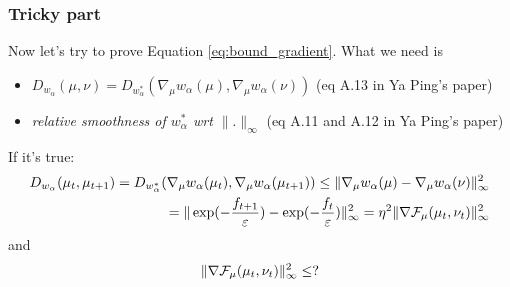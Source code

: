 \documentclass[a4paper, 10pt]{article}
\begin{document}
\subsubsection{Tricky part}
Now let's try to prove Equation \ref{eq:bound_gradient}. 
What we need is 
\begin{itemize}
	\item $D_{w_{\alpha}}(\mu,\nu)=D_{w_{\alpha}^*}(\nabla_{\mu}w_{\alpha}(\mu), \nabla_{\mu}w_{\alpha}(\nu))$ (eq A.13 in Ya Ping's paper)
	\item  \textit{relative smoothness of $w_{\alpha}^*$ wrt $\|.\|_{\infty}$} (eq A.11 and A.12 in Ya Ping's paper)
\end{itemize}
 If it's true:
\begin{align*}
D_{w_{\alpha}}(\mu_t,\mu_{t+1}) = D_{w_{\alpha}^*}(\nabla_{\mu}w_{\alpha}(\mu_t), \nabla_{\mu}w_{\alpha}(\mu_{t+1}))\le \| \nabla_{\mu}w_{\alpha}(\mu)- \nabla_{\mu}w_{\alpha}(\nu)\|^2_{\infty}\\
=\| \exp(-\frac{f_{t+1}}{\varepsilon})- \exp(-\frac{f_t}{\varepsilon})\|^2_{\infty} = \eta^2 \| \nabla \mathcal{F}_{\mu}(\mu_t,\nu_t)\|^2_{\infty}
\end{align*}
and 
\begin{align*}
\|\nabla \mathcal{F}_{\mu}(\mu_t,\nu_t)\|^2_{\infty}\le ?
\end{align*}




\printbibliography
\end{document}
